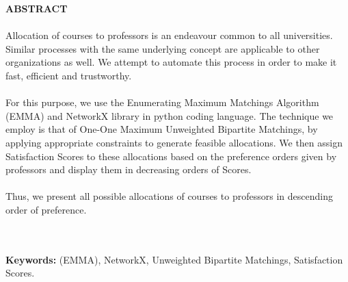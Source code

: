 \begin{center}
\thispagestyle{empty}
\vspace{2cm}
\LARGE{\textbf{ABSTRACT}}\\[1.0cm]
\end{center}
\thispagestyle{empty}
\large{\paragraph{}}
Allocation of courses to professors is an endeavour common to all universities. Similar processes with the same underlying concept are applicable to other organizations as well. We attempt to automate this process in order to make it fast, efficient and trustworthy. 
\large{\paragraph{}For this purpose, we use the Enumerating Maximum Matchings Algorithm (EMMA) and NetworkX library in python coding language. The technique we employ is that of One-One Maximum Unweighted Bipartite Matchings, by applying appropriate constraints to generate feasible allocations. We then assign Satisfaction Scores to these allocations based on the preference orders given by professors and display them in decreasing orders of Scores.}
\large{\paragraph{} Thus, we present all possible allocations of courses to professors in descending order of preference.}\\ \\
\textbf{Keywords: }(EMMA), NetworkX, Unweighted Bipartite Matchings, Satisfaction Scores.